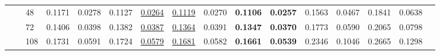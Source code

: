 {\begin{table}
{\begin{tabular}{p{12mm}p{6mm}p{6mm}p{6mm}p{8mm}p{8mm}p{8mm}p{8mm}p{8mm}p{8mm}p{8mm}p{8mm}p{8mm}p{8mm}p{8mm}p{8mm}}
                          &                         & 48   & 0.1171         & 0.0278     &0.1127 & \underline{0.0264}   &\underline{0.1119}       & 0.0270       & \textbf{0.1106}       & \textbf{0.0257 }      & 0.1563        & 0.0467        & 0.1841         & 0.0638        \\
                          &                         & 72   & 0.1406 	&0.0398     &0.1382  &\underline{0.0387}     & \underline{0.1364}        & 0.0391       & \textbf{0.1347}       & \textbf{0.0370}       & 0.1773        & 0.0590        & 0.2065         & 0.0798        \\
                          &                         & 108  &0.1731 	&0.0591   &0.1724 & \underline{0.0579}      & \underline{0.1681}        & 0.0582       & \textbf{0.1661}       & \textbf{0.0539}       & 0.2346        & 0.1046        & 0.2665         & 0.1298        \\
                          \midrule



\end{tabular}}
\end{table}}
